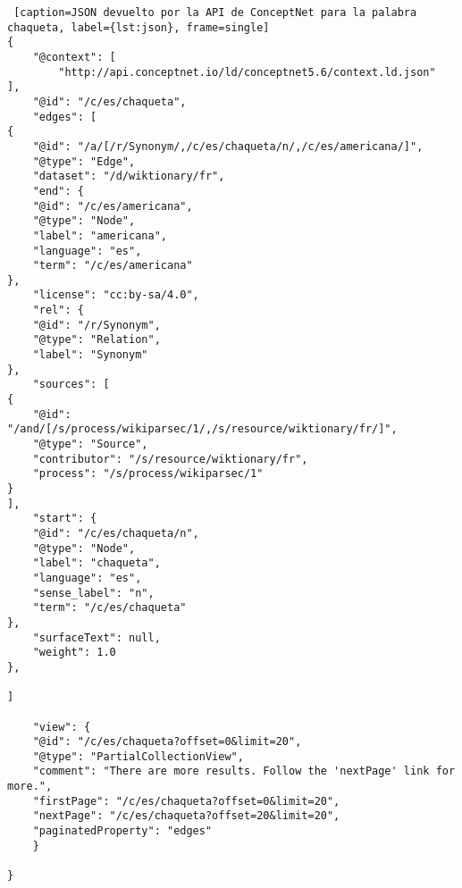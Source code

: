 
\begin{lstlisting} [caption=JSON devuelto por la API de ConceptNet para la palabra chaqueta, label={lst:json}, frame=single]
{
	"@context": [
		"http://api.conceptnet.io/ld/conceptnet5.6/context.ld.json"
],
	"@id": "/c/es/chaqueta",
	"edges": [
{
	"@id": "/a/[/r/Synonym/,/c/es/chaqueta/n/,/c/es/americana/]",
	"@type": "Edge",
	"dataset": "/d/wiktionary/fr",
	"end": {
	"@id": "/c/es/americana",
	"@type": "Node",
	"label": "americana",
	"language": "es",
	"term": "/c/es/americana"
},
	"license": "cc:by-sa/4.0",
	"rel": {
	"@id": "/r/Synonym",
	"@type": "Relation",
	"label": "Synonym"
},
	"sources": [
{
	"@id": "/and/[/s/process/wikiparsec/1/,/s/resource/wiktionary/fr/]",
	"@type": "Source",
	"contributor": "/s/resource/wiktionary/fr",
	"process": "/s/process/wikiparsec/1"
}
],
	"start": {
	"@id": "/c/es/chaqueta/n",
	"@type": "Node",
	"label": "chaqueta",
	"language": "es",
	"sense_label": "n",
	"term": "/c/es/chaqueta"
},
	"surfaceText": null,
	"weight": 1.0
},

]

	"view": {
	"@id": "/c/es/chaqueta?offset=0&limit=20",
	"@type": "PartialCollectionView",
	"comment": "There are more results. Follow the 'nextPage' link for more.",
	"firstPage": "/c/es/chaqueta?offset=0&limit=20",
	"nextPage": "/c/es/chaqueta?offset=20&limit=20",
	"paginatedProperty": "edges"
	}

}
\end{lstlisting} 



